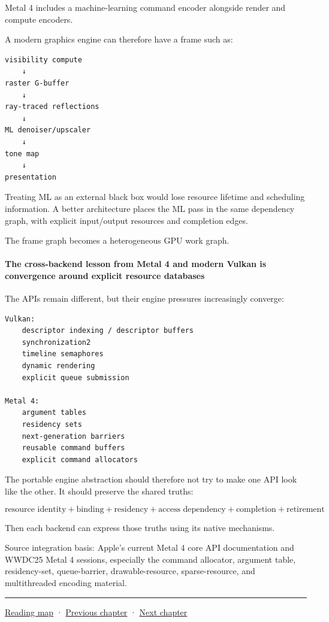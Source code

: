 Metal 4 includes a machine-learning command encoder alongside render and compute encoders.

A modern graphics engine can therefore have a frame such as:

\begin{verbatim}
visibility compute
    ↓
raster G-buffer
    ↓
ray-traced reflections
    ↓
ML denoiser/upscaler
    ↓
tone map
    ↓
presentation
\end{verbatim}

Treating ML as an external black box would lose resource lifetime and scheduling information. A better architecture places the ML pass in the same dependency graph, with explicit input/output resources and completion edges.

The frame graph becomes a heterogeneous GPU work graph.

\paragraph{The cross-backend lesson from Metal 4 and modern Vulkan is convergence around explicit resource databases}\label{the-cross-backend-lesson-from-metal-4-and-modern-vulkan-is-convergence-around-explicit-resource-databases}

The APIs remain different, but their engine pressures increasingly converge:

\begin{verbatim}
Vulkan:
    descriptor indexing / descriptor buffers
    synchronization2
    timeline semaphores
    dynamic rendering
    explicit queue submission

Metal 4:
    argument tables
    residency sets
    next-generation barriers
    reusable command buffers
    explicit command allocators
\end{verbatim}

The portable engine abstraction should therefore not try to make one API look like the other. It should preserve the shared truths:

\[
\boxed{
\text{resource identity}
+
\text{binding}
+
\text{residency}
+
\text{access dependency}
+
\text{completion}
+
\text{retirement}
}
\]

Then each backend can express those truths using its native mechanisms.

Source integration basis: Apple's current Metal 4 core API documentation and WWDC25 Metal 4 sessions, especially the command allocator, argument table, residency-set, queue-barrier, drawable-resource, sparse-resource, and multithreaded encoding material.

\begin{center}\rule{0.5\linewidth}{0.5pt}\end{center}

\href{Chapter\%20Edition/03\%20-\%20Game\%20Engine/00\%20-\%20Reading\%20Map}{Reading map} · \hyperref[05-engine-i-ch021]{Previous chapter} · \hyperref[05-engine-i-ch023]{Next chapter}

